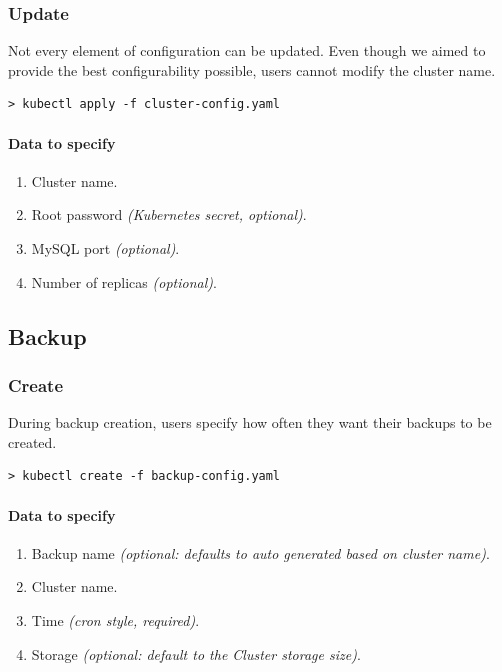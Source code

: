 \subsubsection*{Update}

Not every element of configuration can be updated. Even though we aimed 
to provide the best configurability possible, users cannot modify the
cluster name.

\begin{lstlisting}
> kubectl apply -f cluster-config.yaml
\end{lstlisting}

\paragraph{Data to specify}
\begin{enumerate}
	\item Cluster name.
	\item Root password \textit{(Kubernetes secret, optional)}.
	\item MySQL port \textit{(optional)}.
	\item Number of replicas \textit{(optional)}.
\end{enumerate}

\subsection{Backup}
\subsubsection*{Create}

During backup creation, users specify how often they want their backups 
to be created.

\begin{lstlisting}
> kubectl create -f backup-config.yaml
\end{lstlisting}

\paragraph{Data to specify}
\begin{enumerate}
	\item Backup name \textit{(optional: defaults to auto generated based on cluster name)}.
	\item Cluster name.
	\item Time \textit{(cron style, required)}.
	\item Storage \textit{(optional: default to the Cluster storage size)}.
\end{enumerate}

